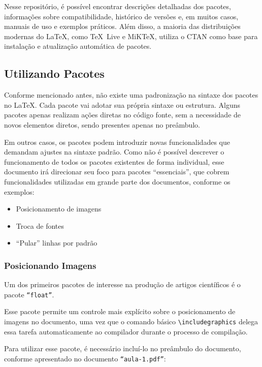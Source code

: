\documentclass{article}
\begin{document}
Nesse repositório, é possível encontrar descrições detalhadas dos pacotes, informações sobre compatibilidade, histórico de versões e, em muitos casos, manuais de uso e exemplos práticos. Além disso, a maioria das distribuições modernas do \LaTeX, como \TeX\ Live e MiK\TeX, utiliza o CTAN como base para instalação e atualização automática de pacotes.


\subsection{Utilizando Pacotes}
Conforme mencionado antes, não existe uma padronização na sintaxe dos pacotes no \LaTeX. Cada pacote vai adotar sua própria sintaxe ou estrutura. Alguns pacotes apenas realizam ações diretas no código fonte, sem a necessidade de novos elementos diretos, sendo presentes apenas no preâmbulo. 

Em outros casos, os pacotes podem introduzir novas funcionalidades que demandam ajustes na sintaxe padrão. Como não é possível descrever o funcionamento de todos os pacotes existentes de forma individual, esse documento irá direcionar seu foco para pacotes ``essenciais'', que cobrem funcionalidades utilizadas em grande parte dos documentos, conforme os exemplos:

\begin{itemize}
	\item Posicionamento de imagens
	\item Troca de fontes
	\item ``Pular'' linhas por padrão
\end{itemize}

\subsubsection{Posicionando Imagens}

Um dos primeiros pacotes de interesse na produção de artigos científicos é o pacote \texttt{``float''}.

Esse pacote permite um controle mais explícito sobre o posicionamento de imagens no documento, uma vez que o comando básico \texttt{\textbackslash includegraphics} delega essa tarefa automaticamente ao compilador durante o processo de compilação.

Para utilizar esse pacote, é necessário incluí-lo no preâmbulo do documento, conforme apresentado no documento \texttt{``aula-1.pdf''}:

\begin{teX}
	\usepackage{float}
\end{teX}
\end{document}
